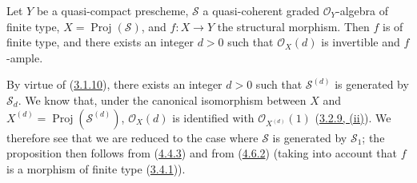 \begin{proposition}[4.6.18]
\label{II.4.6.18}
Let $Y$ be a quasi-compact prescheme, $\mathcal{S}$ a quasi-coherent graded
$\mathcal{O}_Y$-algebra of finite type,
$X=\operatorname{Proj}(\mathcal{S})$, and $f:X\to Y$ the structural morphism.
Then $f$ is of finite type, and there exists an integer $d>0$ such that
$\mathcal{O}_X(d)$ is invertible and $f$-ample.
\end{proposition}

By virtue of (\hyperref[II.3.1.10]{3.1.10}), there exists an integer $d>0$
such that $\mathcal{S}^{(d)}$ is generated by $\mathcal{S}_d$. We know that,
under the canonical isomorphism between $X$ and
$X^{(d)}=\operatorname{Proj}(\mathcal{S}^{(d)})$, $\mathcal{O}_X(d)$
is identified with $\mathcal{O}_{X^{(d)}}(1)$
(\hyperref[II.3.2.9]{3.2.9, (ii)}). We therefore see that we are reduced to the case
where $\mathcal{S}$ is generated by $\mathcal{S}_1$; the proposition then follows
from (\hyperref[II.4.4.3]{4.4.3}) and from
(\hyperref[II.4.6.2]{4.6.2}) (taking into account that $f$ is a morphism
of finite type (\hyperref[II.3.4.1]{3.4.1})).

